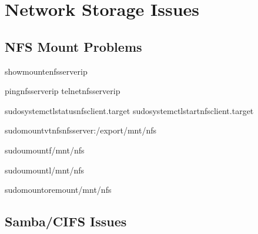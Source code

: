 \documentclass[letterpaper,10pt,english]{sphinxmanual}
\begin{document}
\section{Network Storage Issues}
\label{\detokenize{troubleshooting:network-storage-issues}}

\subsection{NFS Mount Problems}
\label{\detokenize{troubleshooting:nfs-mount-problems}}
\sphinxAtStartPar
{}

\begin{sphinxVerbatim}[commandchars=\\\{\}]
showmount\PYGZhy{}enfs\PYGZhy{}server\PYGZhy{}ip

pingnfs\PYGZhy{}server\PYGZhy{}ip
telnetnfs\PYGZhy{}server\PYGZhy{}ip

sudosystemctlstatusnfs\PYGZhy{}client.target
sudosystemctlstartnfs\PYGZhy{}client.target

sudomount\PYGZhy{}v\PYGZhy{}tnfsnfs\PYGZhy{}server:/export/mnt/nfs
\end{sphinxVerbatim}

\sphinxAtStartPar
{}

\begin{sphinxVerbatim}[commandchars=\\\{\}]
sudoumount\PYGZhy{}f/mnt/nfs

sudoumount\PYGZhy{}l/mnt/nfs

sudomount\PYGZhy{}oremount/mnt/nfs
\end{sphinxVerbatim}


\subsection{Samba/CIFS Issues}
\label{\detokenize{troubleshooting:samba-cifs-issues}}
\sphinxAtStartPar
{}
\end{document}
